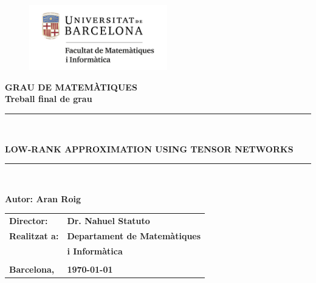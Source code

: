 \documentclass[11pt,a4paper,openright,oneside]{book}
\numberwithin{equation}{section}
\begin{document}

\thispagestyle{empty}

\begin{titlepage}
\begin{center}
\begin{figure}[htb]
\begin{center}
\includegraphics[width=6cm]{matematiquesinformatica-pos-rgb.png}
\end{center}
\end{figure}

\vspace*{1cm}
\textbf{\LARGE GRAU DE MATEM\`{A}TIQUES } \\
\vspace*{.5cm}
\textbf{\LARGE Treball final de grau} \\

\vspace*{1.5cm}
\rule{16cm}{0.1mm}\\
\begin{Huge}
\textbf{LOW-RANK APPROXIMATION USING TENSOR NETWORKS} \\
\end{Huge}
\rule{16cm}{0.1mm}\\

\vspace{1cm}

\begin{flushright}
\textbf{\LARGE Autor: Aran Roig}

\vspace*{2cm}

\renewcommand{\arraystretch}{1.5}
\begin{tabular}{ll}
\textbf{\Large Director:} & \textbf{\Large Dr. Nahuel Statuto} \\
\textbf{\Large Realitzat a:} & \textbf{\Large  Departament de Matemàtiques   } \\
 & \textbf{\Large i Informàtica} \\
\\
\textbf{\Large Barcelona,} & \textbf{\Large \today }
\end{tabular}

\end{flushright}

\end{center}



\end{titlepage}
\end{document}
